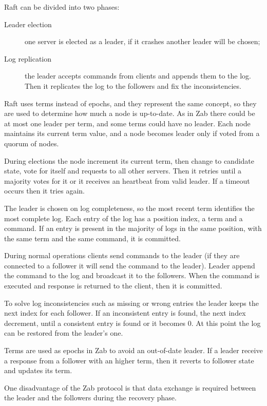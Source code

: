 \clearpage

Raft can be divided into two phases:
\begin{description}
    \item[Leader election] one server is elected as a leader, if it crashes another leader will be chosen;
    \item[Log replication] the leader accepts commands from clients and appends them to the log. Then it replicates the log to the followers and fix the inconsistencies. 
\end{description}

Raft uses terms instead of epochs, and they represent the same concept, so they are used to determine how much a node is up-to-date. As in Zab there could be at most one leader per term, and some terms could have no leader. Each node maintains its current term value, and a node becomes leader only if voted from a quorum of nodes.

During elections the node increment its current term, then change to candidate state, vote for itself and requests to all other servers.
Then it retries until a majority votes for it or it receives an heartbeat from valid leader. If a timeout occurs then it tries again.
    
The leader is chosen on log completeness, so the most recent term identifies the most complete log.    
Each entry of the log has a position index, a term and a command. If an entry is present in the majority of logs in the same position, with the same term and the same command, it is committed.

During normal operations clients send commands to the leader (if they are connected to a follower it will send the command to the leader). Leader append the command to the log and broadcast it to the followers. When the command is executed and response is returned to the client, then it is committed.

To solve log inconsistencies such as missing or wrong entries the leader keeps the next index for each follower. If an inconsistent entry is found, the next index decrement, until a consistent entry is found or it becomes $0$. At this point the log can be restored from the leader's one.

Terms are used as epochs in Zab to avoid an out-of-date leader. If a leader receive a response from a follower with an higher term, then it reverts to follower state and updates its term.

One disadvantage of the Zab protocol is that data exchange is required between the leader and the followers during the recovery phase.